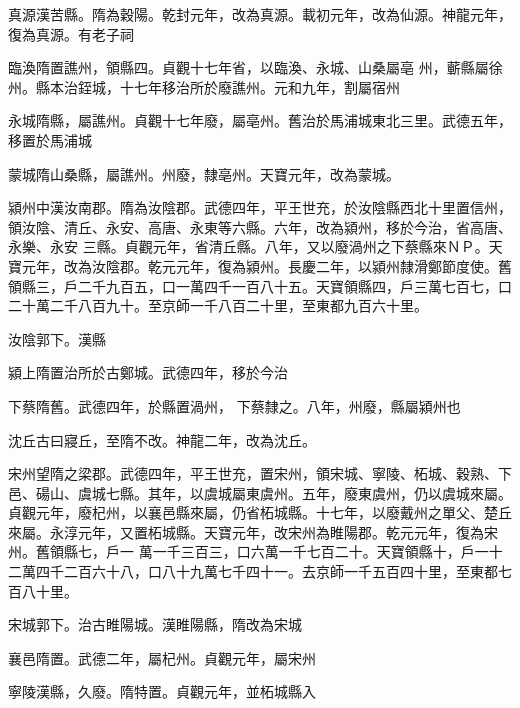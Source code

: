 \begin{pinyinscope}
 真源漢苦縣。隋為穀陽。乾封元年，改為真源。載初元年，改為仙源。神龍元年，復為真源。有老子祠



 臨渙隋置譙州，領縣四。貞觀十七年省，以臨渙、永城、山桑屬亳
 州，蘄縣屬徐州。縣本治銍城，十七年移治所於廢譙州。元和九年，割屬宿州



 永城隋縣，屬譙州。貞觀十七年廢，屬亳州。舊治於馬浦城東北三里。武德五年，移置於馬浦城



 蒙城隋山桑縣，屬譙州。州廢，隸亳州。天寶元年，改為蒙城。



 潁州中漢汝南郡。隋為汝陰郡。武德四年，平王世充，於汝陰縣西北十里置信州，領汝陰、清丘、永安、高唐、永東等六縣。六年，改為潁州，移於今治，省高唐、永樂、永安
 三縣。貞觀元年，省清丘縣。八年，又以廢渦州之下蔡縣來ＮＰ。天寶元年，改為汝陰郡。乾元元年，復為潁州。長慶二年，以潁州隸滑鄭節度使。舊領縣三，戶二千九百五，口一萬四千一百八十五。天寶領縣四，戶三萬七百七，口二十萬二千八百九十。至京師一千八百二十里，至東都九百六十里。



 汝陰郭下。漢縣



 潁上隋置治所於古鄭城。武德四年，移於今治



 下蔡隋舊。武德四年，於縣置渦州，
 下蔡隸之。八年，州廢，縣屬潁州也



 沈丘古曰寢丘，至隋不改。神龍二年，改為沈丘。



 宋州望隋之梁郡。武德四年，平王世充，置宋州，領宋城、寧陵、柘城、穀熟、下邑、碭山、虞城七縣。其年，以虞城屬東虞州。五年，廢東虞州，仍以虞城來屬。貞觀元年，廢杞州，以襄邑縣來屬，仍省柘城縣。十七年，以廢戴州之單父、楚丘來屬。永淳元年，又置柘城縣。天寶元年，改宋州為睢陽郡。乾元元年，復為宋州。舊領縣七，戶一
 萬一千三百三，口六萬一千七百二十。天寶領縣十，戶一十二萬四千二百六十八，口八十九萬七千四十一。去京師一千五百四十里，至東都七百八十里。



 宋城郭下。治古睢陽城。漢睢陽縣，隋改為宋城



 襄邑隋置。武德二年，屬杞州。貞觀元年，屬宋州



 寧陵漢縣，久廢。隋特置。貞觀元年，並柘城縣入




\end{pinyinscope}

